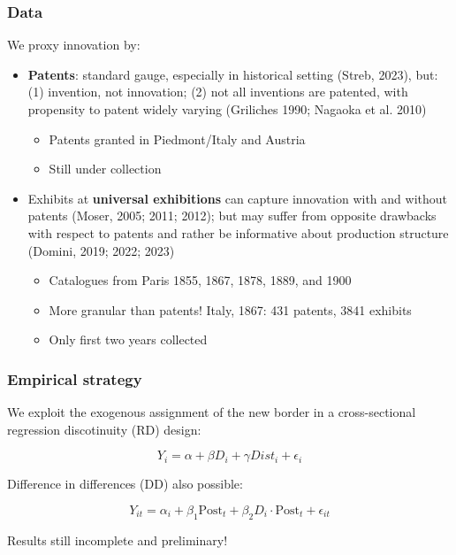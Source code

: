 \documentclass[10pt]{beamer}
\begin{document}
\begin{frame}
    \frametitle{Data}
    
    We proxy innovation by:

    \begin{itemize}
        \item \textbf{Patents}: standard gauge, especially in historical setting (Streb, 2023), but: (1) invention, not innovation; (2) not all inventions are patented, with propensity to patent widely varying (Griliches 1990; Nagaoka et al. 2010)
        
        \begin{itemize}
            \item Patents granted in Piedmont/Italy and Austria
            \item Still under collection 
        \end{itemize}

        \pause
        
        \item Exhibits at \textbf{universal exhibitions} can capture innovation with and without patents (Moser, 2005; 2011; 2012); but may suffer from opposite drawbacks with respect to patents and rather be informative about production structure (Domini, 2019; 2022; 2023)
         
        \begin{itemize}
            \item Catalogues from Paris 1855, 1867, 1878, 1889, and 1900
            \item More granular than patents! Italy, 1867: 431 patents, 3841 exhibits 
            \item Only first two years collected
        \end{itemize}

    \end{itemize}
    
\end{frame}

\begin{frame}
    \frametitle{Empirical strategy}
    
    We exploit the exogenous assignment of the new border in a cross-sectional regression discotinuity (RD) design:    

    \begin{equation*}
        Y_{i} = \alpha + \beta D_i + \gamma Dist_i + \epsilon_i 
    \end{equation*}

    \bigskip
    
    Difference in differences (DD) also possible:

    \begin{equation*}
        Y_{it} = \alpha_i + \beta_1 \text{Post}_t + \beta_2 D_i \cdot \text{Post}_t + \epsilon_{it}
    \end{equation*}

    \bigskip
    
    Results still incomplete and preliminary!

\end{frame}
\end{document}
